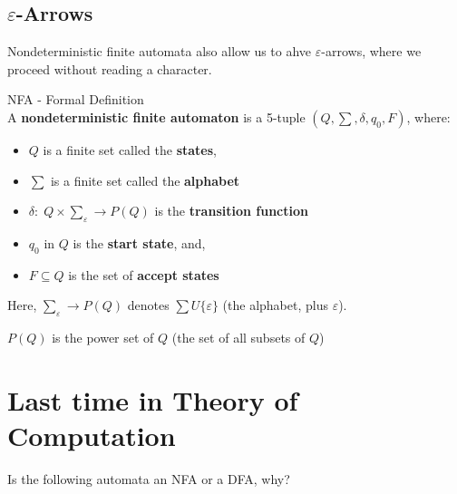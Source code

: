 \documentclass[10pt,oneside]{book}
\newcommand{\gspc}{\vspace{0.13cm}} %
\newcommand{\gline}[0]{\gspc\\} %
\begin{document}
\subsection*{$\varepsilon$-Arrows}
Nondeterministic finite automata also allow us to ahve $\varepsilon$-arrows, where we proceed without reading a character.

\begin{definition}{NFA - Formal Definition}{}\gline{}
  A \textbf{nondeterministic finite automaton} is a 5-tuple $(Q, \sum, \delta, q_0, F)$, where:
  \begin{itemize}
    \item $Q$ is a finite set called the \textbf{states},
    \item $\sum$ is a finite set called the \textbf{alphabet}
    \item $\delta:\;Q\times \sum_\varepsilon\to P(Q)$ is the \textbf{transition function}
    \item $q_0$ in $Q$ is the \textbf{start state}, and,
    \item $F\subseteq Q$ is the set of \textbf{accept states}
  \end{itemize}
  Here, $\sum_\varepsilon\to P(Q)$ denotes $\sum U\{\varepsilon\}$ (the alphabet, plus $\varepsilon$). 

  $P(Q)$ is the power set of $Q$ (the set of all subsets of $Q$)
\end{definition}

\section*{Last time in Theory of Computation}
Is the following automata an NFA or a DFA, why?
\end{document}
